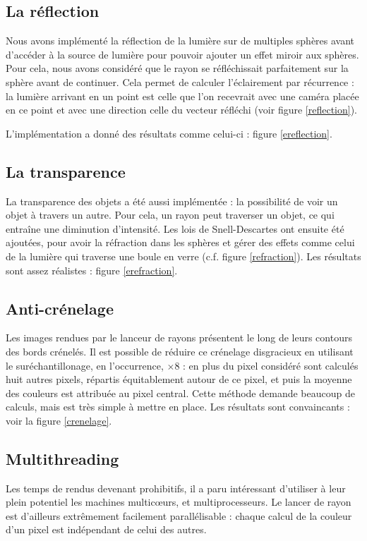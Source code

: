\subsection{La réflection}
Nous avons implémenté la réflection de la lumière sur de multiples sphères avant d'accéder à la source de lumière pour pouvoir ajouter un effet miroir aux sphères. Pour cela, nous avons considéré que le rayon se réfléchissait parfaitement sur la sphère avant de continuer. Cela permet de calculer l'éclairement par récurrence : la lumière arrivant en un point est celle que l'on recevrait avec une caméra placée en ce point et avec une direction celle du vecteur réfléchi (voir figure \ref{reflection}).

L'implémentation a donné des résultats comme celui-ci : figure \ref{ereflection}.

\subsection{La transparence}
  La transparence des objets a été aussi implémentée : la possibilité de voir un objet à travers un autre. Pour cela, un rayon peut traverser un objet, ce qui entraîne une diminution d'intensité. Les lois de Snell-Descartes ont ensuite été ajoutées, pour avoir la réfraction dans les sphères et gérer des effets comme celui de la lumière qui traverse une boule en verre (c.f. figure \ref{refraction}).
Les résultats sont assez réalistes :  figure \ref{erefraction}.

\subsection{Anti-crénelage}
  Les images rendues par le lanceur de rayons présentent le long de leurs contours des bords crénelés.
Il est possible de réduire ce crénelage disgracieux en utilisant le suréchantillonage, en l'occurrence, $\times 8$ : en plus 
 du pixel considéré sont calculés huit autres pixels, répartis équitablement autour de ce pixel, et puis la moyenne des couleurs est attribuée au pixel central.
Cette méthode demande beaucoup de calculs, mais est très simple à mettre en place.
  Les résultats sont convaincants : voir la figure \ref{crenelage}.
 
\subsection{Multithreading}
  Les temps de rendus devenant prohibitifs, il a paru intéressant d'utiliser à leur plein potentiel les machines multicœurs, et multiprocesseurs.
  Le lancer de rayon est d'ailleurs extrêmement facilement parallélisable : chaque calcul de la couleur d'un pixel est indépendant de celui des 
  autres.
  
